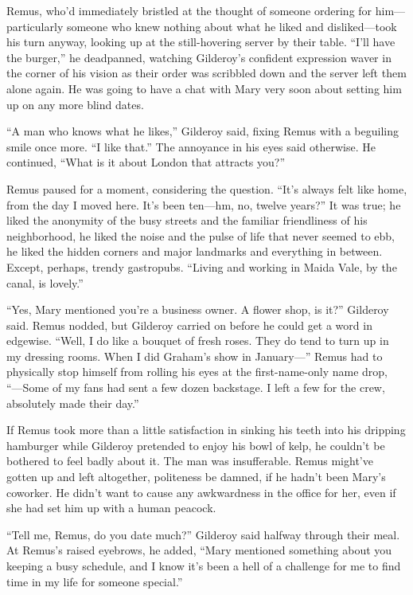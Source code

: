 Remus, who’d immediately bristled at the thought of someone ordering for him—particularly someone who knew nothing about what he liked and disliked—took his turn anyway, looking up at the still-hovering server by their table. “I’ll have the burger,” he deadpanned, watching Gilderoy’s confident expression waver in the corner of his vision as their order was scribbled down and the server left them alone again. He was going to have a chat with Mary very soon about setting him up on any more blind dates.

“A man who knows what he likes,” Gilderoy said, fixing Remus with a beguiling smile once more. “I like that.” The annoyance in his eyes said otherwise. He continued, “What is it about London that attracts you?”

Remus paused for a moment, considering the question. “It’s always felt like home, from the day I moved here. It’s been ten—hm, no, twelve years?” It was true; he liked the anonymity of the busy streets and the familiar friendliness of his neighborhood, he liked the noise and the pulse of life that never seemed to ebb, he liked the hidden corners and major landmarks and everything in between. Except, perhaps, trendy gastropubs. “Living and working in Maida Vale, by the canal, is lovely.”

“Yes, Mary mentioned you’re a business owner. A flower shop, is it?” Gilderoy said. Remus nodded, but Gilderoy carried on before he could get a word in edgewise. “Well, I do like a bouquet of fresh roses. They do tend to turn up in my dressing rooms. When I did Graham’s show in January—” Remus had to physically stop himself from rolling his eyes at the first-name-only name drop, “—Some of my fans had sent a few dozen backstage. I left a few for the crew, absolutely made their day.”

If Remus took more than a little satisfaction in sinking his teeth into his dripping hamburger while Gilderoy pretended to enjoy his bowl of kelp, he couldn’t be bothered to feel badly about it. The man was insufferable. Remus might’ve gotten up and left altogether, politeness be damned, if he hadn’t been Mary’s coworker. He didn’t want to cause any awkwardness in the office for her, even if she had set him up with a human peacock.

“Tell me, Remus, do you date much?” Gilderoy said halfway through their meal. At Remus’s raised eyebrows, he added, “Mary mentioned something about you keeping a busy schedule, and I know it’s been a hell of a challenge for me to find time in my life for someone special.”

